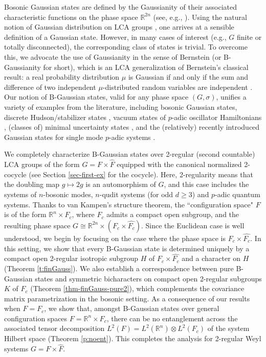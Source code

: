 \documentclass[12pt,reqno]{amsart}
\theoremstyle{definition}
\theoremstyle{definition}
\theoremstyle{definition}
\numberwithin{thm}{section}
\numberwithin{equation}{section}
\newcommand{\Real}{\mathbb R}
\newcommand{\ten}{\otimes}
\newcommand{\wh}[1]{\widehat{#1}}
\newcommand{\bR}{\mathbb{R}}
\begin{document}
Bosonic Gaussian states are defined by the Gaussianity of their associated characteristic functions on the phase space $\Real^{2n}$ (see, e.g., \cite{wetal}). Using the natural notion of Gaussian distribution on LCA groups \cite{Partha1963}, one arrives at a sensible definition of a Gaussian state. However, in many cases of interest (e.g., $G$ finite or totally disconnected), the corresponding class of states is trivial. To overcome this, we advocate the use of Gaussianity in the sense of Bernstein (or B-Gaussianity for short), which is an LCA generalization of Bernstein's classical result: a real
probability distribution $\mu$ is Gaussian if and only if the sum and difference of two independent $\mu$-distributed random variables  are independent \cite{Bernstein}.
Our notion of B-Gaussian states, valid for any phase space $(G,\sigma)$, unifies a variety of examples from the literature, including bosonic Gaussian states, discrete Hudson/stabilizer states \cite{Gro}, vacuum states of $p$-adic oscillator Hamiltonians \cite{VV2}, (classes of) minimal uncertainty states \cite{OP}, and the (relatively) recently introduced Gaussian states for single mode $p$-adic systems \cite{Z,Z2}.

We completely characterize B-Gaussian states over 2-regular (second countable) LCA groups of the form $G=F\times\widehat{F}$ equipped with the canonical normalized 2-cocycle (see Section \ref{sec-first-ex} for the cocycle). Here, 2-regularity means that the doubling map $g\mapsto 2g$ is an automorphism of $G$, and this case includes the systems of $n$-bosonic modes, $n$-qudit systems (for odd $d\geq 3$) and $p$-adic quantum systems.
Thanks to van Kampen's structure theorem, the ``configuration space" $F$ is of the form $\Real^n \times F_c$, where $F_c$ admits a compact open subgroup, and the resulting phase space $G\cong \bR^{2n}\times(F_c\times\widehat{F_c})$. Since the Euclidean case is well understood, we begin by focusing on the case where the phase space is $F_c\times\wh{F_c}$. In this setting, we show that every B-Gaussian state is determined uniquely by a compact open 2-regular isotropic subgroup $H$ of $F_c\times\wh{F_c}$ and a character on $H$ (Theorem \ref{t:finGauss}). We also establish a correspondence between pure B-Gaussian states and symmetric bicharacters on compact open 2-regular subgroups $K$ of $F_c$ (Theorem \ref{thm-finGauss-pure2}), which complements the covariance matrix parametrization in the bosonic setting. As a consequence of our results when $F=F_c$, we show that, amongst B-Gaussian states over general configuration spaces $F=\Real^n \times F_c$, there can be no entanglement across the associated tensor decomposition $L^2(F)=L^2(\bR^{n})\ten L^2(F_c)$ of the system Hilbert space (Theorem \ref{p:noent}). This completes the analysis for 2-regular Weyl systems $G=F\times\widehat{F}$.
\end{document}
